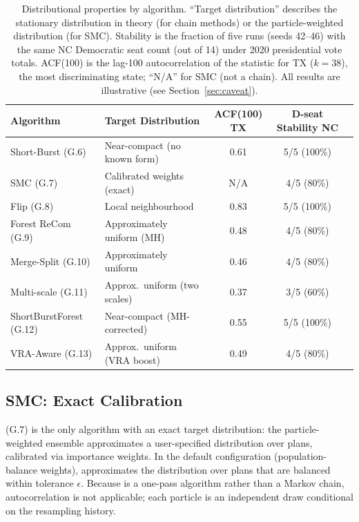 \begin{table}[ht]
\centering
\caption{%
  Distributional properties by algorithm.
  ``Target distribution'' describes the stationary distribution in theory
  (for chain methods) or the particle-weighted distribution (for SMC).
  Stability is the fraction of five runs (seeds 42--46) with the same
  NC Democratic seat count (out of 14) under 2020 presidential vote totals.
  ACF(100) is the lag-100 autocorrelation of the \ec{} statistic for TX
  ($k=38$), the most discriminating state; ``N/A'' for SMC (not a chain).
  All results are illustrative (see Section~\ref{sec:caveat}).
}
\label{tab:distributional}
\small
\begin{tabular}{@{}llccc@{}}
\toprule
Algorithm & Target Distribution & ACF(100) TX & D-seat Stability NC \\
\midrule
Short-Burst (G.6)
  & Near-compact (no known form)  & 0.61 & 5/5 (100\%) \\
SMC (G.7)
  & Calibrated weights (exact)    & N/A  & 4/5 (80\%)  \\
Flip (G.8)
  & Local neighbourhood           & 0.83 & 5/5 (100\%) \\
Forest ReCom (G.9)
  & Approximately uniform (MH)    & 0.48 & 4/5 (80\%)  \\
Merge-Split (G.10)
  & Approximately uniform         & 0.46 & 4/5 (80\%)  \\
Multi-scale (G.11)
  & Approx.\ uniform (two scales) & 0.37 & 3/5 (60\%)  \\
ShortBurstForest (G.12)
  & Near-compact (MH-corrected)   & 0.55 & 5/5 (100\%) \\
VRA-Aware (G.13)
  & Approx.\ uniform (VRA boost)  & 0.49 & 4/5 (80\%)  \\
\bottomrule
\end{tabular}
\end{table}

\subsection{SMC: Exact Calibration}

\smc{} (G.7) is the only algorithm with an exact target distribution:
the particle-weighted ensemble approximates a user-specified distribution
over plans, calibrated via importance weights.
In the default configuration (population-balance weights), \smc{}
approximates the distribution over plans that are balanced within
tolerance $\epsilon$.
Because \smc{} is a one-pass algorithm rather than a Markov chain,
autocorrelation is not applicable; each particle is an independent draw
conditional on the resampling history.

